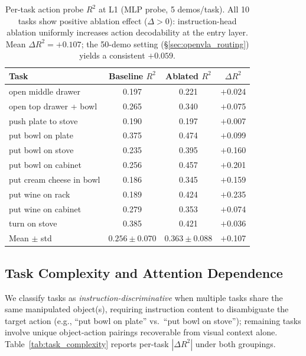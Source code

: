 \begin{table}[h]
\centering
\caption{Per-task action probe $R^2$ at L1 (MLP probe, 5 demos/task). All 10 tasks show positive ablation effect ($\Delta > 0$): instruction-head ablation uniformly increases action decodability at the entry layer. Mean $\Delta R^2 = +0.107$; the 50-demo setting (\S\ref{sec:openvla_routing}) yields a consistent $+0.059$.}
\label{tab:per_task_r2}
\small
\begin{tabular}{lccc}
\toprule
\textbf{Task} & \textbf{Baseline $R^2$} & \textbf{Ablated $R^2$} & \textbf{$\Delta R^2$} \\
\midrule
open middle drawer & 0.197 & 0.221 & $+$0.024 \\
open top drawer + bowl & 0.265 & 0.340 & $+$0.075 \\
push plate to stove & 0.190 & 0.197 & $+$0.007 \\
put bowl on plate & 0.375 & 0.474 & $+$0.099 \\
put bowl on stove & 0.235 & 0.395 & $+$0.160 \\
put bowl on cabinet & 0.256 & 0.457 & $+$0.201 \\
put cream cheese in bowl & 0.186 & 0.345 & $+$0.159 \\
put wine on rack & 0.189 & 0.424 & $+$0.235 \\
put wine on cabinet & 0.279 & 0.353 & $+$0.074 \\
turn on stove & 0.385 & 0.421 & $+$0.036 \\
\midrule
Mean $\pm$ std & $0.256 \pm 0.070$ & $0.363 \pm 0.088$ & $+$0.107 \\
\bottomrule
\end{tabular}
\end{table}

\subsection{Task Complexity and Attention Dependence}
\label{sec:task_complexity}

We classify tasks as \emph{instruction-discriminative} when multiple tasks share the same manipulated object(s), requiring instruction content to disambiguate the target action (e.g., ``put bowl on plate'' vs.\ ``put bowl on stove''); remaining tasks involve unique object-action pairings recoverable from visual context alone.
Table~\ref{tab:task_complexity} reports per-task $|\Delta R^2|$ under both groupings.

